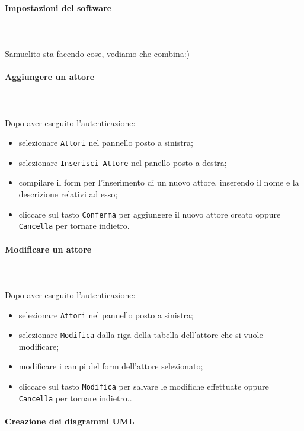 \paragraph{Impostazioni del software} \mbox{}\\ \mbox{}\\
Samuelito sta facendo cose, vediamo che combina:)

\paragraph{Aggiungere un attore} \mbox{}\\ \mbox{}\\
Dopo aver eseguito l'autenticazione:
\begin{itemize}
	\item selezionare \texttt{Attori} nel pannello posto a sinistra;
	\item selezionare \texttt{Inserisci Attore} nel panello posto a destra;
	\item compilare il form per l'inserimento di un nuovo attore, inserendo 
		il nome e la descrizione relativi ad esso;
	\item cliccare sul tasto \texttt{Conferma} per aggiungere il nuovo attore 
		creato oppure \texttt{Cancella} per tornare indietro.	
\end{itemize}

\paragraph{Modificare un attore} \mbox{}\\ \mbox{}\\
Dopo aver eseguito l'autenticazione:
\begin{itemize}
	\item selezionare \texttt{Attori} nel pannello posto a sinistra;
	\item selezionare \texttt{Modifica} dalla riga della tabella dell'attore
		che si vuole modificare;
	\item modificare i campi del form dell'attore selezionato;
	\item cliccare sul tasto \texttt{Modifica} per salvare le modifiche effettuate
		oppure \texttt{Cancella} per tornare indietro..	
\end{itemize}

\paragraph{Creazione dei diagrammi UML} \mbox{}\\ \mbox{}\\

